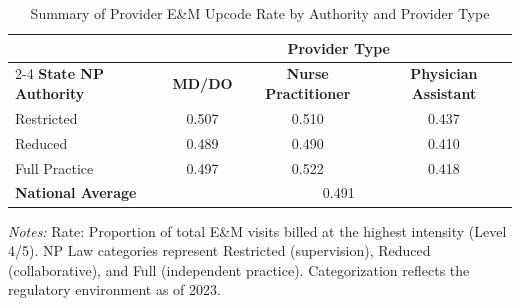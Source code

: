 \begin{table}[htbp]
    \centering
    \caption{Summary of Provider E\&M Upcode Rate by Authority and Provider Type}
    \label{tab:partb_em_upcode_rate}
    \vspace{0.2cm}
    \begin{tabular}{lccc}
        \toprule
        & \multicolumn{3}{c}{\textbf{Provider Type}} \\
        \cmidrule(lr){2-4}
        \textbf{State NP Authority} & \textbf{MD/DO} & \textbf{Nurse Practitioner} & \textbf{Physician Assistant} \\
        \midrule
        Restricted & 0.507 & 0.510 & 0.437 \\
        Reduced & 0.489 & 0.490 & 0.410 \\
        Full Practice & 0.497 & 0.522 & 0.418 \\
        \midrule
        \textbf{National Average} & \multicolumn{3}{c}{0.491} \\
        \bottomrule
    \end{tabular}
    \vspace{0.1cm}
    \begin{minipage}{0.85\textwidth}
        \footnotesize \textit{Notes:} Rate: Proportion of total E\&M visits billed at the highest intensity (Level 4/5). NP Law categories represent Restricted (supervision), Reduced (collaborative), and Full (independent practice). Categorization reflects the regulatory environment as of 2023.
    \end{minipage}
\end{table}